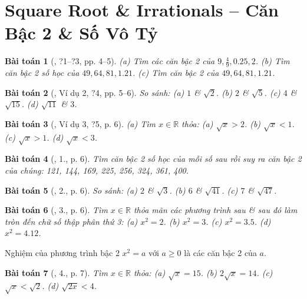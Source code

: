 \documentclass{article}
\newtheorem{baitoan}{Bài toán}
\begin{document}
\tableofcontents
\newpage


\section{Square Root \& Irrationals -- Căn Bậc 2 \& Số Vô Tỷ}

\begin{baitoan}[\cite{SGK_Toan_9_tap_1}, ?1--?3, pp. 4--5]
	(a) Tìm các căn bậc 2 của $9,\frac{4}{9},0.25,2$. (b) Tìm căn bậc 2 số học của $49,64,81,1.21$. (c) Tìm căn bậc 2 của $49,64,81,1.21$.
\end{baitoan}

\begin{baitoan}[\cite{SGK_Toan_9_tap_1}, Ví dụ 2, ?4, pp. 5--6]
	So sánh: (a) $1$ \& $\sqrt{2}$. (b) $2$ \& $\sqrt{5}$. (c) $4$ \& $\sqrt{15}$. (d) $\sqrt{11}$ \& $3$.
\end{baitoan}

\begin{baitoan}[\cite{SGK_Toan_9_tap_1}, Ví dụ 3, ?5, p. 6]
	(a) Tìm $x\in\mathbb{R}$ thỏa: (a) $\sqrt{x} > 2$. (b) $\sqrt{x} < 1$. (c) $\sqrt{x} > 1$. (d) $\sqrt{x} < 3$.
\end{baitoan}

\begin{baitoan}[\cite{SGK_Toan_9_tap_1}, 1., p. 6]
	Tìm căn bậc 2 số học của mỗi số sau rồi suy ra căn bậc 2 của chúng: \emph{121, 144, 169, 225, 256, 324, 361, 400}.
\end{baitoan}

\begin{baitoan}[\cite{SGK_Toan_9_tap_1}, 2., p. 6]
	So sánh: (a) $2$ \& $\sqrt{3}$. (b) $6$ \& $\sqrt{41}$. (c) $7$ \& $\sqrt{47}$.
\end{baitoan}

\begin{baitoan}[\cite{SGK_Toan_9_tap_1}, 3., p. 6]
	Tìm $x\in\mathbb{R}$ thỏa mãn các phương trình sau \& sau đó làm tròn đến chữ số thập phân thứ 3: (a) $x^2 = 2$. (b) $x^2 = 3$. (c) $x^2 = 3.5$. (d) $x^2 = 4.12$.
\end{baitoan}
 Nghiệm của phương trình bậc 2 $x^2 = a$ với $a\ge0$ là các căn bậc 2 của $a$.

\begin{baitoan}[\cite{SGK_Toan_9_tap_1}, 4., p. 7]
	Tìm $x\in\mathbb{R}$ thỏa: (a) $\sqrt{x} = 15$. (b) $2\sqrt{x} = 14$. (c) $\sqrt{x} < \sqrt{2}$. (d) $\sqrt{2x} < 4$.
\end{baitoan}
\end{document}
